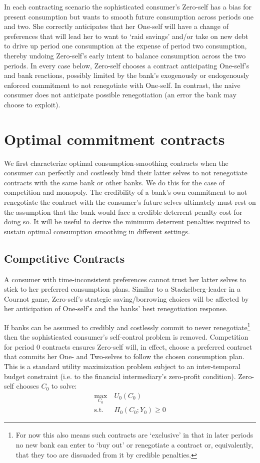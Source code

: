\documentclass[11pt,english]{article}
\theoremstyle{plain}
\theoremstyle{definition}
\begin{document}
In each contracting scenario the sophisticated consumer's Zero-self
has a bias for present consumption but wants to smooth future consumption
across periods one and two. She correctly anticipates that her One-self
will have a change of preferences that will lead her to want to `raid
savings' and/or take on new debt to drive up period one consumption
at the expense of period two consumption, thereby undoing Zero-self's
early intent to balance consumption across the two periods. In every
case below, Zero-self chooses a contract anticipating One-self's and
bank reactions, possibly limited by the bank's exogenously or endogenously
enforced commitment to not renegotiate with One-self. In contrast,
the naive consumer does not anticipate possible renegotiation (an
error the bank may choose to exploit).

\section{Optimal commitment contracts }

We first characterize optimal consumption-smoothing contracts when
the consumer can perfectly and costlessly bind their latter selves
to not renegotiate contracts with the same bank or
other banks. We do this for the case of competition and monopoly.
The credibility of a bank's own commitment to not renegotiate the
contract with the consumer's future selves ultimately must rest on
the assumption that the bank would face a credible deterrent penalty
cost for doing so. It will be useful to derive the minimum deterrent penalties required to sustain optimal consumption
smoothing in different settings.

\subsection{ Competitive Contracts}

\label{sec-FCC} A consumer with time-inconsistent preferences cannot
trust her latter selves to stick to her preferred consumption plans.
Similar to a Stackelberg-leader in a Cournot game, Zero-self's strategic
saving/borrowing choices will be affected by her anticipation of One-self's
and the banks' best renegotiation response. 

If banks can be assumed to credibly and costlessly commit to never
renegotiate\footnote{ For now this also means such contracts are `exclusive' in
that in later periods no new bank can enter to `buy out'
or renegotiate a contract or, equivalently, that they too are dissuaded
from it by credible penalties. } then the sophisticated consumer's self-control problem is removed.
Competition for period 0 contracts ensures Zero-self will, in
effect, choose a preferred contract that commits her One- and Two-selves
to follow the chosen consumption plan. This is a standard utility
maximization problem subject to an inter-temporal budget constraint
(i.e. to the financial intermediary's zero-profit condition). Zero-self
chooses $C_{0}$ to solve: 
\begin{align}
\max_{C_{0}} & \ U_{0}(C_{0})\label{eq:cobj0}\\
\text{s.t.} & \ \Pi_{0}(C_{0};Y_{0})\geq0\label{eq:BPC0}
\end{align}
\end{document}
